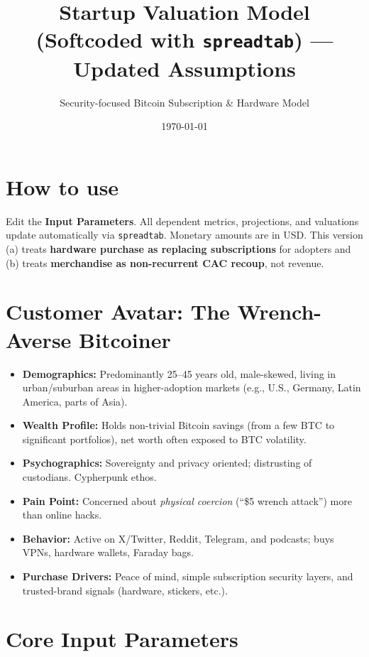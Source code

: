 \documentclass[11pt]{article}
\begin{document}
\title{Startup Valuation Model (Softcoded with \texttt{spreadtab}) --- Updated Assumptions}
\author{Security-focused Bitcoin Subscription \& Hardware Model}
\date{\today}
\maketitle

\section*{How to use}
Edit the \textbf{Input Parameters}. All dependent metrics, projections, and valuations update automatically via \texttt{spreadtab}. Monetary amounts are in USD. This version (a) treats \textbf{hardware purchase as replacing subscriptions} for adopters and (b) treats \textbf{merchandise as non-recurrent CAC recoup}, not revenue.

\section{Customer Avatar: The Wrench-Averse Bitcoiner}
\begin{itemize}
  \item \textbf{Demographics:} Predominantly 25--45 years old, male-skewed, living in urban/suburban areas in higher-adoption markets (e.g., U.S., Germany, Latin America, parts of Asia).
  \item \textbf{Wealth Profile:} Holds non-trivial Bitcoin savings (from a few BTC to significant portfolios), net worth often exposed to BTC volatility.
  \item \textbf{Psychographics:} Sovereignty and privacy oriented; distrusting of custodians. Cypherpunk ethos.
  \item \textbf{Pain Point:} Concerned about \emph{physical coercion} (``\$5 wrench attack'') more than online hacks.
  \item \textbf{Behavior:} Active on X/Twitter, Reddit, Telegram, and podcasts; buys VPNs, hardware wallets, Faraday bags.
  \item \textbf{Purchase Drivers:} Peace of mind, simple subscription security layers, and trusted-brand signals (hardware, stickers, etc.).
\end{itemize}

\section{Core Input Parameters}
\end{document}
